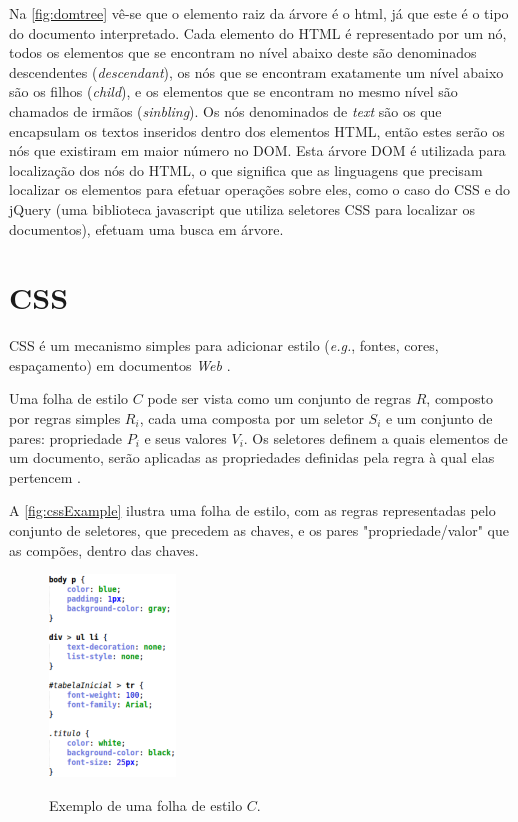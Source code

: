 Na \autoref{fig:domtree} vê-se que o elemento raiz da árvore é o html, já que este é o tipo do documento interpretado. Cada elemento do HTML é representado por um nó, todos os elementos que se encontram no nível abaixo deste são denominados descendentes (\textit{descendant}), os nós que se encontram exatamente um nível abaixo são os filhos (\textit{child}), e os elementos que se encontram no mesmo nível são chamados de irmãos (\textit{sinbling}). Os nós denominados de \textit{text} são os que encapsulam os textos inseridos dentro dos elementos HTML, então estes serão os nós que existiram em maior número no DOM. 
Esta árvore DOM é utilizada para localização dos nós do HTML, o que significa que as linguagens que precisam localizar os elementos para efetuar operações sobre eles, como o caso do CSS e do jQuery (uma biblioteca javascript que utiliza seletores CSS para localizar os documentos), efetuam uma busca em árvore.

\section{CSS}
\label{sec:CSS}
CSS é um mecanismo simples para adicionar estilo (\textit{e.g.}, fontes, cores, espaçamento) em documentos \textit{Web} \cite{W3Ccss2015}.

Uma folha de estilo \(C\) pode ser vista como um conjunto de regras \(R\), composto por regras simples \(R_i\), cada uma composta por um seletor \(S_i\) e um conjunto de pares: propriedade \(P_i\) e seus valores \(V_i\). Os seletores definem a quais elementos de um documento, serão aplicadas as propriedades definidas pela regra à qual elas pertencem \cite{Geneves2012}.

A \autoref{fig:cssExample} ilustra uma folha de estilo, com as regras representadas pelo conjunto de seletores, que precedem as chaves, e os pares "propriedade/valor" que as compões, dentro das chaves.

\begin{figure}[!htb]
	\centering
	\caption{Exemplo de uma folha de estilo \(C\).}
	\includegraphics[width=0.3\textwidth]{./04-figuras/css_example}
	\label{fig:cssExample}
\end{figure}

